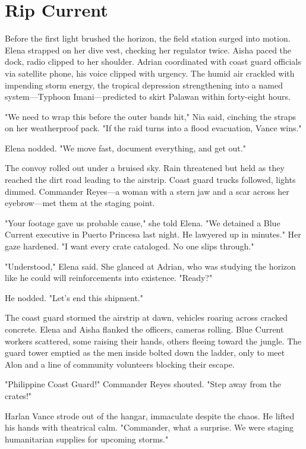 \chapter{Rip Current}

Before the first light brushed the horizon, the field station surged into motion. Elena strapped on her dive vest, checking her regulator twice. Aisha paced the dock, radio clipped to her shoulder. Adrian coordinated with coast guard officials via satellite phone, his voice clipped with urgency. The humid air crackled with impending storm energy, the tropical depression strengthening into a named system—Typhoon Imani—predicted to skirt Palawan within forty-eight hours.

"We need to wrap this before the outer bands hit," Nia said, cinching the straps on her weatherproof pack. "If the raid turns into a flood evacuation, Vance wins."

Elena nodded. "We move fast, document everything, and get out."

The convoy rolled out under a bruised sky. Rain threatened but held as they reached the dirt road leading to the airstrip. Coast guard trucks followed, lights dimmed. Commander Reyes—a woman with a stern jaw and a scar across her eyebrow—met them at the staging point.

"Your footage gave us probable cause," she told Elena. "We detained a Blue Current executive in Puerto Princesa last night. He lawyered up in minutes." Her gaze hardened. "I want every crate cataloged. No one slips through."

"Understood," Elena said. She glanced at Adrian, who was studying the horizon like he could will reinforcements into existence. "Ready?"

He nodded. "Let's end this shipment."

\bigskip

The coast guard stormed the airstrip at dawn, vehicles roaring across cracked concrete. Elena and Aisha flanked the officers, cameras rolling. Blue Current workers scattered, some raising their hands, others fleeing toward the jungle. The guard tower emptied as the men inside bolted down the ladder, only to meet Alon and a line of community volunteers blocking their escape.

"Philippine Coast Guard!" Commander Reyes shouted. "Step away from the crates!"

Harlan Vance strode out of the hangar, immaculate despite the chaos. He lifted his hands with theatrical calm. "Commander, what a surprise. We were staging humanitarian supplies for upcoming storms."


